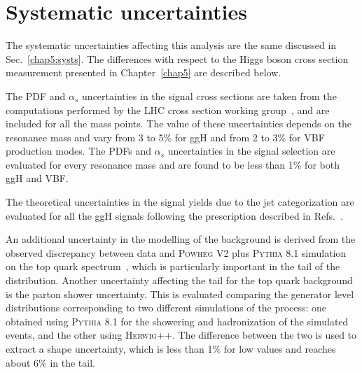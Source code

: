 \section{Systematic uncertainties}\label{chap6:Systematics}

The systematic uncertainties affecting this analysis are the same discussed in Sec.~\ref{chap5:systs}. The differences with respect to the Higgs boson cross section measurement presented in Chapter~\ref{chap5} are described below.

The PDF and $\alpha_s$ uncertainties in the signal cross sections are taken from the computations performed by the LHC cross section working group~\cite{YRtmp}, and are included for all the mass points. The value of these uncertainties depends on the resonance mass and vary from 3 to 5\% for ggH and from 2 to 3\% for VBF production modes. The PDFs and $\alpha_{s}$ uncertainties in the signal selection are evaluated for every resonance mass and are found to be less than 1\% for both ggH and VBF.

The theoretical uncertainties in the signal yields due to the jet categorization are evaluated for all the ggH signals following the prescription described in Refs.~\cite{Stewart:2011cf,Heinemeyer:2013tqa}.

An additional uncertainty in the modelling of the \ttbar background is derived from the observed discrepancy between data and \textsc{Powheg V2} plus \textsc{Pythia 8.1} simulation on the top quark \pt spectrum~\cite{Khachatryan:2015oqa}, which is particularly important in the tail of the \mti distribution. Another uncertainty affecting the \mti tail for the top quark background is the parton shower uncertainty. This is evaluated comparing the generator level \mti distributions corresponding to two different simulations of the \ttbar process: one obtained using \textsc{Pythia 8.1} for the showering and hadronization of the simulated events, and the other using \textsc{Herwig++}. The difference between the two is used to extract a shape uncertainty, which is less than 1\% for low \mti values and reaches about 6\% in the \mti tail.







